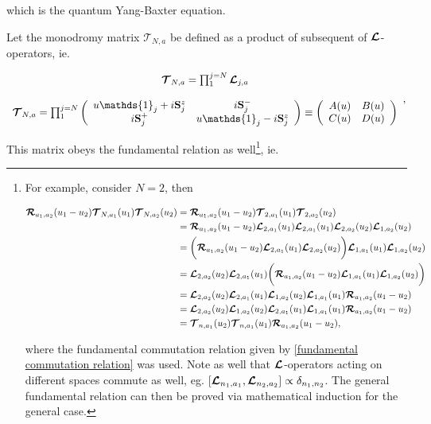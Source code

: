 \documentclass{homework}
\begin{document}
which is the quantum Yang-Baxter equation. \\

\begin{df}
    Let the monodromy matrix $\bm{\mathcal{T}}_{N,a}$ be defined as a product of subsequent of $\bm{\mathcal{L}}$-operators, ie.

\begin{equation}
    \begin{array}{c}
         \bmt_{N,a} = \prod^{j=N}_{1} \bl_{j,a} \\
         \\
         \bmt_{N,a} = \prod^{j=N}_{1} \left(\begin{array}{cc}
            u \mathds{1}_j + i \spin_j^z & i \spin_j^-  \\
            i \spin_j^+ & u \mathds{1}_j - i \spin_j^z
         \end{array}\right) \equiv \left(\begin{array}{cc}
            A(u) & B(u) \\
            C(u) & D(u)
         \end{array}\right) 
    \end{array},
\end{equation}
\end{df}

\clearpage

This matrix obeys the fundamental relation as well\footnote{ For example, consider $N=2$, then

\begin{equation}
    \begin{split}
        {\bm {\mathcal{R}}_{a_1, a_2}(u_1-u_2) \bm{\mathcal{T}}_{N, a_1} (u_1) \bm{\mathcal{T}}_{N, a_2} (u_2)} &= {\bm {\mathcal{R}}_{a_1, a_2}(u_1-u_2) \bm{\mathcal{T}}_{2, a_1} (u_1) \bm{\mathcal{T}}_{2, a_2} (u_2)} \\
        &= {\bm {\mathcal{R}}_{a_1, a_2}(u_1-u_2) \bm{\mathcal{L}}_{2, a_1} (u_1) \bm{\mathcal{L}}_{2, a_1} (u_1) \bm{\mathcal{L}}_{2, a_2} (u_2) \bm{\mathcal{L}}_{1, a_2} (u_2)} \\
        &= \bigg(\bm {\mathcal{R}}_{a_1, a_2}(u_1-u_2) \bm{\mathcal{L}}_{2, a_1} (u_1) \bm{\mathcal{L}}_{2, a_2} (u_2)\bigg) \bm{\mathcal{L}}_{1, a_1} (u_1) \bm{\mathcal{L}}_{1, a_2} (u_2) \\
        &=  \bm{\mathcal{L}}_{2, a_2} (u_2) \bm{\mathcal{L}}_{2, a_1} (u_1) \bigg(\bm {\mathcal{R}}_{a_1, a_2}(u_1-u_2)\bm{\mathcal{L}}_{1, a_1} (u_1) \bm{\mathcal{L}}_{1, a_2} (u_2) \bigg) \\
        &= \bm{\mathcal{L}}_{2, a_2} (u_2) \bm{\mathcal{L}}_{2, a_1} (u_1) \bm{\mathcal{L}}_{1, a_2} (u_2) \bm{\mathcal{L}}_{1, a_1} (u_1) \bm {\mathcal{R}}_{a_1, a_2}(u_1-u_2) \\
        &=  \bm{\mathcal{L}}_{2, a_2} (u_2) \bm{\mathcal{L}}_{1, a_2} (u_2) \bm{\mathcal{L}}_{2, a_1} (u_1) \bm{\mathcal{L}}_{1, a_1} (u_1) \bm {\mathcal{R}}_{a_1, a_2}(u_1-u_2) \\
        &= \bm{\mathcal{T}}_{n, a_1} (u_2) \bm{\mathcal{T}}_{n, a_1} (u_1) \bm{\mathcal{R}}_{a_1, a_2}(u_1-u_2),
    \end{split}
\end{equation}

where the fundamental commutation relation given by \eqref{fundamental commutation relation} was used. Note as well that $\bm{\mathcal{L}}$-operators acting on different spaces commute as well, eg. $[\bm{\mathcal{L}}_{n_1, a_1}, \bm{\mathcal{L}}_{n_2, a_2}] \propto \delta_{n_1, n_2}$. The general fundamental relation can then be proved via mathematical induction for the general case.}, ie.
\end{document}
